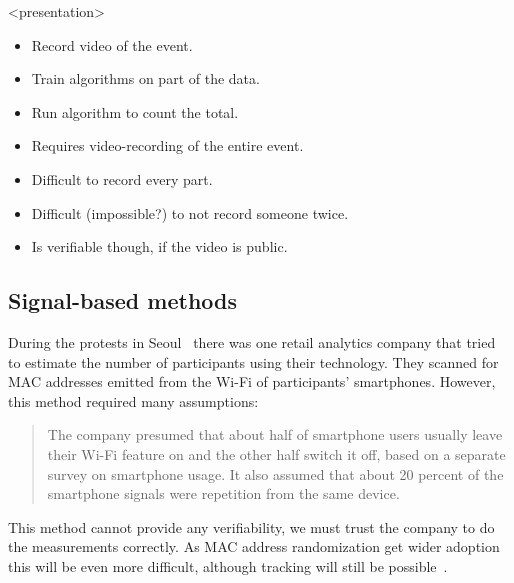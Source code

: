 \begin{frame}<presentation>
  \begin{solution}
    \begin{itemize}
      \item Record video of the event.
      \item Train algorithms on part of the data.
      \item Run algorithm to count the total.
    \end{itemize}
  \end{solution}

  \pause

  \begin{remark}
    \begin{itemize}
      \item Requires video-recording of the entire event.
      \item Difficult to record every part.
      \item Difficult (impossible?) to not record someone twice.
      \item Is verifiable though, if the video is public.
    \end{itemize}
  \end{remark}
\end{frame}

\subsection<presentation>{Signal-based methods}

During the protests in Seoul~\cite{2016DemonstrationsInSeoul} there was one 
retail analytics company that tried to estimate the number of participants 
using their technology.
They scanned for MAC addresses emitted from the Wi-Fi of participants' 
smartphones.
However, this method required many assumptions:
\blockcquote{2016DemonstrationsInSeoul}{%
  The company presumed that about half of smartphone users usually leave their 
  Wi-Fi feature on and the other half switch it off, based on a separate survey 
  on smartphone usage. It also assumed that about 20 percent of the smartphone 
  signals were repetition from the same device.
}
This method cannot provide any verifiability, we must trust the company to do 
the measurements correctly.
As MAC address randomization get wider adoption this will be even more 
difficult, although tracking will still be 
possible~\cite{WhyMACRandomizationIsNotEnough}.

